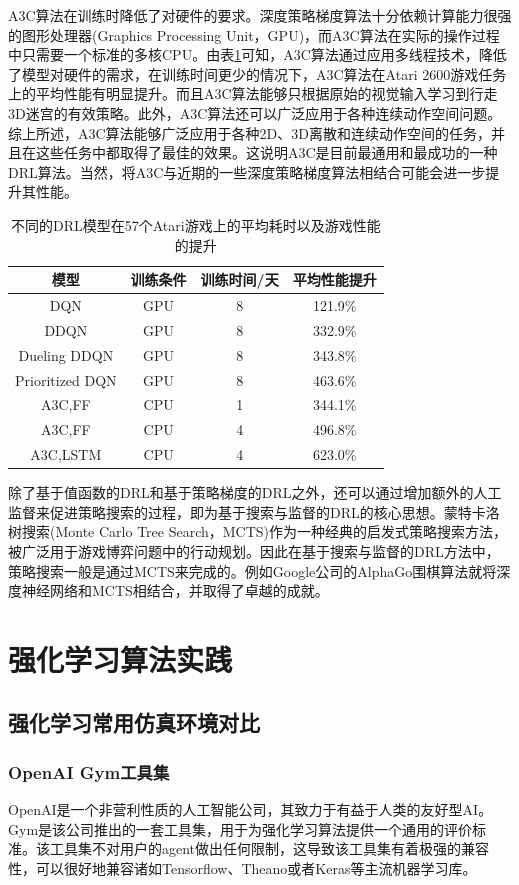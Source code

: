 \documentclass[bachelor]{thesis-uestc}
\begin{document}
	A3C算法在训练时降低了对硬件的要求。深度策略梯度算法十分依赖计算能力很强的图形处理器(Graphics Processing Unit，GPU)，而A3C算法在实际的操作过程中只需要一个标准的多核CPU。由表\ref{tb1}可知，A3C算法通过应用多线程技术，降低了模型对硬件的需求，在训练时间更少的情况下，A3C算法在Atari 2600游戏任务上的平均性能有明显提升。而且A3C算法能够只根据原始的视觉输入学习到行走3D迷宫的有效策略。此外，A3C算法还可以广泛应用于各种连续动作空间问题。综上所述，A3C算法能够广泛应用于各种2D、3D离散和连续动作空间的任务，并且在这些任务中都取得了最佳的效果。这说明A3C是目前最通用和最成功的一种DRL算法。当然，将A3C与近期的一些深度策略梯度算法相结合可能会进一步提升其性能。
	
	\begin{table}[h]
		\caption{不同的DRL模型在57个Atari游戏上的平均耗时以及游戏性能的提升}
		\label{tb1}
		\begin{tabular}{|c|c|c|c|}
			\hline
			模型 & 训练条件 & 训练时间/天 & 平均性能提升 \\
			\hline
			DQN & GPU & 8 & 121.9\% \\
			\hline
			DDQN & GPU & 8 & 332.9\% \\
			\hline
			Dueling DDQN & GPU & 8 & 343.8\% \\
			\hline
			Prioritized DQN & GPU & 8 & 463.6\% \\
			\hline
			A3C,FF & CPU & 1 & 344.1\% \\
			\hline
			A3C,FF & CPU & 4 & 496.8\% \\
			\hline
			A3C,LSTM & CPU & 4 & 623.0\% \\
			\hline
		\end{tabular}
	\end{table}
	除了基于值函数的DRL和基于策略梯度的DRL之外，还可以通过增加额外的人工监督来促进策略搜索的过程，即为基于搜索与监督的DRL的核心思想。蒙特卡洛树搜索(Monte Carlo Tree Search，MCTS)作为一种经典的启发式策略搜索方法，被广泛用于游戏博弈问题中的行动规划。因此在基于搜索与监督的DRL方法中，策略搜索一般是通过MCTS来完成的。例如Google公司的AlphaGo围棋算法就将深度神经网络和MCTS相结合，并取得了卓越的成就。
	
	\chapter{强化学习算法实践}
	\section{强化学习常用仿真环境对比}
	\subsection{OpenAI Gym工具集}
	OpenAI是一个非营利性质的人工智能公司，其致力于有益于人类的友好型AI。Gym是该公司推出的一套工具集，用于为强化学习算法提供一个通用的评价标准。该工具集不对用户的agent做出任何限制，这导致该工具集有着极强的兼容性，可以很好地兼容诸如Tensorflow、Theano或者Keras等主流机器学习库。
	
\end{document}
